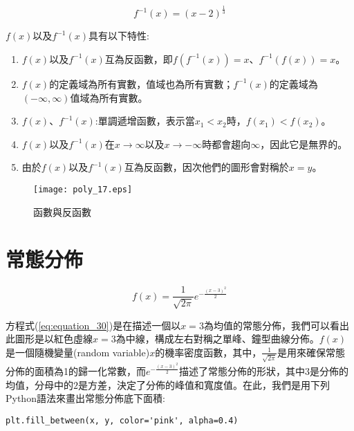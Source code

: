\documentclass[12pt, a4paper]{article}
\begin{document}
\begin{equation}\label{eq:equation_12}
f^{-1}(x)=(x-2)^{\frac{1}{3}}
\end{equation}

$f(x)$\;以及\;$f^{-1}(x)$\;具有以下特性\;:
\begin{enumerate}
\item $f(x)$\;以及\;$f^{-1}(x)$\;互為反函數，即\;$f(f^{-1}(x))=x$、$f^{-1}(f(x))=x$\;。
\item $f(x)$\;的定義域為所有實數，值域也為所有實數；\;$f^{-1}(x)$\;的定義域為\;$(-\infty, \infty)$\;值域為所有實數。
\item $f(x)$、$f^{-1}(x)$\;:\;單調遞增函數，表示當\;$x_1<x_2$\;時，\;$f(x_1)<f(x_2)$\;。
\item $f(x)$\;以及\;$f^{-1}(x)$\;在\;$x \rightarrow \infty$\;以及\;$x \rightarrow -\infty$\;時都會趨向\;$\infty$\;，因此它是無界的。
\item 由於\;$f(x)$\;以及\;$f^{-1}(x)$\;互為反函數，因次他們的圖形會對稱於\;$x=y$\;。
\end{enumerate}

\begin{figure}[h]
\centering
\texttt{[image: poly\_17.eps]}
\caption{函數與反函數}
\label{fig:poly_17.eps}
\end{figure}

\section{常態分佈}
\begin{equation}
f(x) = \frac{1}{\sqrt{2\pi}}e^{-\frac{(x-3)^2}{2}}\label{eq:equation_30}
\end{equation} 

方程式\;(\ref{eq:equation_30})\;是在描述一個以\;$x=3$\;為均值的常態分佈，我們可以看出此圖形是以紅色虛線\;$x=3$\;為中線，構成左右對稱之單峰、鐘型曲線分佈。$f(x)$\;是一個隨機變量(random variable)\;$x$\;的機率密度函數，其中，\;$\frac{1}{\sqrt{2\pi}}$\;是用來確保常態分佈的面積為1的歸一化常數，而\;$e^{-\frac{(x-3)^2}{2}}$\;描述了常態分佈的形狀，其中\;$3$\;是分佈的均值，分母中的\;$2$\;是方差，決定了分佈的峰值和寬度值。在此，我們是用下列Python語法來畫出常態分佈底下面積\;:
\begin{lstlisting}
plt.fill_between(x, y, color='pink', alpha=0.4)
\end{lstlisting}
\end{document}
